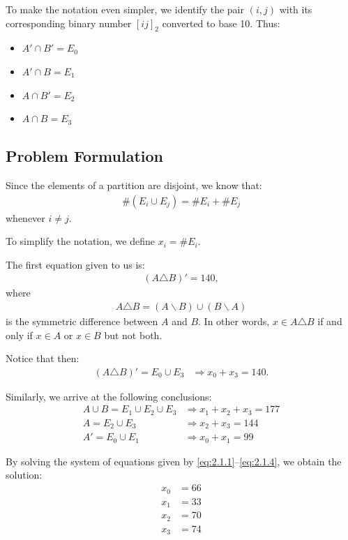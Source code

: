 To make the notation even simpler, we identify the pair $ (i,j) $ with its corresponding binary number $ [ij]_{2} $ converted to base 10. Thus:
\begin{itemize}
	\item $ A' \cap B' = E_{0}$
	\item $ A'  \cap B = E_{1}$
	\item $ A \cap B'  = E_{2}$
	\item $ A  \cap B  = E_{3}$
\end{itemize}

\subsection{Problem Formulation}

Since the elements of a partition are disjoint, we know that:
\begin{align}
	\#\left(E_i\cup E_j\right) = \#E_i+\#E_j
\end{align}
whenever $ i\neq j $.

To simplify the notation, we define $ x_i=\# E_i. $

The first equation given to us is:
\begin{align}
	\left(A \triangle B \right)'=140,
\end{align}
where 
\begin{align}
	A\triangle B = (A\backslash B)\cup(B\backslash A)
\end{align}
is the symmetric difference between $ A $ and $ B $. In other words, $ x\in A \triangle B $ if and only if $ x\in A $ or $ x \in B $ but not both.

Notice that then:
\begin{align}
	\label{eq:2.1.1}
	\left(A\triangle B\right)' = E_0 \cup E_3 &
	\Rightarrow
	x_0 + x_3 = 140.
\end{align}

Similarly, we arrive at the following conclusions:
\begin{align}
	\label{eq:2.1.2}
	A\cup B = E_1\cup E_2 \cup E_3 &
	\Rightarrow x_1+x_2+x_3=177 \\
	\label{eq:2.1.3}
	A = E_2 \cup E_3 &
	\Rightarrow x_2+x_3 = 144 \\
	\label{eq:2.1.4}
	A' = E_0 \cup E_1 &
	\Rightarrow x_0+x_1 =99
\end{align}

By solving the system of equations given by \eqref{eq:2.1.1}--\eqref{eq:2.1.4}, we obtain the solution:
\begin{align}
	x_0 &= 66 \\
	x_1 &= 33 \\
	x_2 &= 70 \\
	x_3 &= 74
\end{align}

